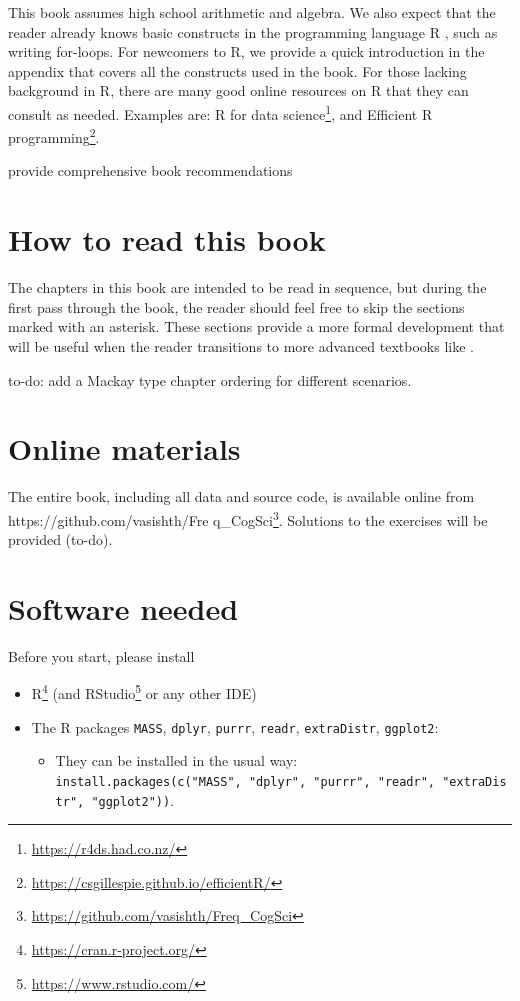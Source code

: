 \documentclass[12pt,]{krantz}
\makeatletter
\providecommand{\tightlist}{%
  \setlength{\itemsep}{0pt}\setlength{\parskip}{0pt}}
\renewcommand{\href}[2]{#2\footnote{\url{#1}}}
\newenvironment{kframe}{%
\medskip{}
\setlength{\fboxsep}{.8em}
 \def\at@end@of@kframe{}%
 \ifinner\ifhmode%
  \def\at@end@of@kframe{\end{minipage}}%
  \begin{minipage}{\columnwidth}%
 \fi\fi%
 \def\FrameCommand##1{\hskip\@totalleftmargin \hskip-\fboxsep
 \colorbox{shadecolor}{##1}\hskip-\fboxsep
     \hskip-\linewidth \hskip-\@totalleftmargin \hskip\columnwidth}%
 \MakeFramed {\advance\hsize-\width
   \@totalleftmargin\z@ \linewidth\hsize
   \@setminipage}}%
 {\par\unskip\endMakeFramed%
 \at@end@of@kframe}
\newenvironment{rmdblock}[1]
  {
  \begin{itemize}
  \renewcommand{\labelitemi}{
    \raisebox{-.7\height}[0pt][0pt]{
      {\setkeys{Gin}{width=3em,keepaspectratio}\texttt{[image: images/\#1]}}
    }
  }
  \setlength{\fboxsep}{1em}
  \begin{kframe}
  \item
  }
  {
  \end{kframe}
  \end{itemize}
  }
\newenvironment{rmdnote}
  {\begin{rmdblock}{note}}
  {\end{rmdblock}}
\makeatother
\begin{document}
This book assumes high school arithmetic and algebra. We also expect that the reader already knows basic constructs in the programming language R \citep{R-base}, such as writing for-loops. For newcomers to R, we provide a quick introduction in the appendix that covers all the constructs used in the book. For those lacking background in R, there are many good online resources on R that they can consult as needed. Examples are: \href{https://r4ds.had.co.nz/}{R for data science}, and \href{https://csgillespie.github.io/efficientR/}{Efficient R programming}.

\begin{rmdnote}
provide comprehensive book recommendations
\end{rmdnote}

\hypertarget{how-to-read-this-book}{%
\section{How to read this book}\label{how-to-read-this-book}}

The chapters in this book are intended to be read in sequence, but during the first pass through the book, the reader should feel free to skip the sections marked with an asterisk. These sections provide a more formal development that will be useful when the reader transitions to more advanced textbooks like \citet{Gelman14}.

to-do: add a Mackay type chapter ordering for different scenarios.

\hypertarget{online-materials}{%
\section{Online materials}\label{online-materials}}

The entire book, including all data and source code, is available online from \href{https://github.com/vasishth/Freq_CogSci}{https://github.com/vasishth/Fre q\_CogSci}. Solutions to the exercises will be provided (to-do).

\hypertarget{software-needed}{%
\section{Software needed}\label{software-needed}}

Before you start, please install

\begin{itemize}
\tightlist
\item
  \href{https://cran.r-project.org/}{R} (and \href{https://www.rstudio.com/}{RStudio} or any other IDE)
\item
  The R packages \texttt{MASS}, \texttt{dplyr}, \texttt{purrr}, \texttt{readr}, \texttt{extraDistr}, \texttt{ggplot2}:

  \begin{itemize}
  \tightlist
  \item
    They can be installed in the usual way: \texttt{install.packages(c("MASS",\ "dplyr",\ "purrr",\ "readr",\ "extraDistr",\ "ggplot2"))}.
  \end{itemize}
\end{itemize}
\end{document}
